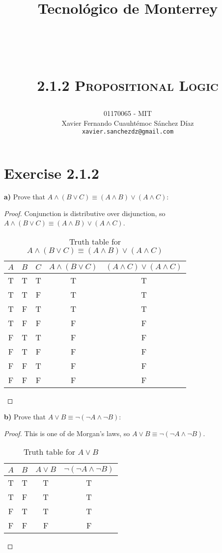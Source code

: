 \documentclass[titlepage, letterpaper, fleqn]{article}
\title{
\vspace{1in}
\textbf{Tecnológico de Monterrey} \\
\vspace{0.5in}
\textmd{\mahclass} \\
\large{\textit{\mahteacher}} \\
\vspace{0.5in}
\textsc{\mahtitle}\\
\textsc{2.1.2 Propositional Logic}\\
\author{01170065  - MIT \\
Xavier Fernando Cuauhtémoc Sánchez Díaz \\
\texttt{xavier.sanchezdz@gmail.com}}
\date{\mahdate}
}
\begin{document}
\begin{titlepage}
\maketitle
\end{titlepage}

%
%

\section{Exercise 2.1.2}

{\large \textbf{a)} Prove that \(A \wedge (B \vee C) \equiv (A \wedge B) \vee (A \wedge C)\):}

\begin{proof}
Conjunction is distributive over disjunction, so \(A \wedge (B \vee C) \equiv (A \wedge B) \vee (A \wedge C)\).

\begin{table}[h!]
\centering
\begin{tabular}{@{}ccccc@{}}
\toprule
\multicolumn{1}{l}{$A$} & \multicolumn{1}{l}{$B$} & \multicolumn{1}{l}{$C$} & \multicolumn{1}{l}{$A \wedge (B \vee C)$} & \multicolumn{1}{l}{$(A \wedge C) \vee (A \wedge C)$} \\ \midrule
T & T & T & T & T \\
T & T & F & T & T \\
T & F & T & T & T \\
T & F & F & F & F \\
F & T & T & F & F \\
F & T & F & F & F \\
F & F & T & F & F \\
F & F & F & F & F \\ \bottomrule
\end{tabular}
\caption{Truth table for \(A \wedge (B \vee C) \equiv (A \wedge B) \vee (A \wedge C)\)}
\label{fig:a}
\end{table}
\end{proof}

{\large \textbf{b)} Prove that \(A \vee B \equiv \neg(\neg A \wedge \neg B)\):}

\begin{proof}
This is one of de Morgan's laws, so \(A \vee B \equiv \neg(\neg A \wedge \neg B)\).

\begin{table}[h!]
\centering
\begin{tabular}{@{}cccc@{}}
\toprule
\multicolumn{1}{l}{$A$} & \multicolumn{1}{l}{$B$} & \multicolumn{1}{l}{$A \vee B$} & \multicolumn{1}{l}{$\neg (\neg A \wedge \neg B)$} \\ \midrule
T & T & T & T \\
T & F & T & T \\
F & T & T & T \\
F & F & F & F \\ \bottomrule
\end{tabular}
\caption{Truth table for \(A \vee B\)}
\label{fig:b}
\end{table}
\end{proof}
\end{document}
